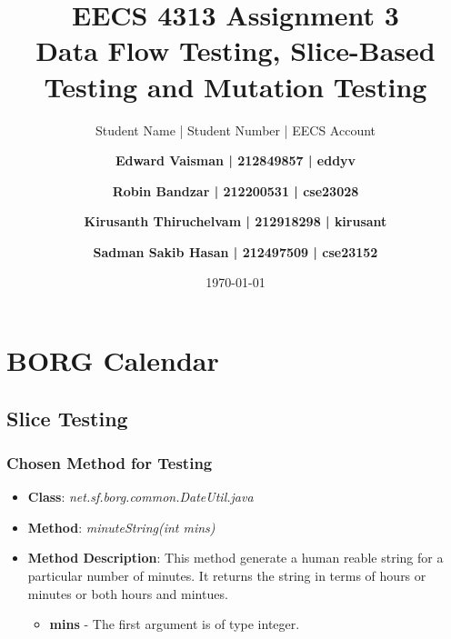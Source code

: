 \documentclass[fontsize=12pt,paper=letter,twoside]{scrartcl}
\author{Student Name | Student Number | EECS Account
\and \textbf{Edward Vaisman | 212849857 | eddyv}
\and \textbf{Robin Bandzar | 212200531 | cse23028}
\and \textbf{Kirusanth Thiruchelvam | 212918298 | kirusant}
\and \textbf{Sadman Sakib Hasan | 212497509 | cse23152}
}
\date{\today} %
\begin{document}
\title{EECS 4313 Assignment 3 \\Data Flow Testing, Slice-Based Testing and Mutation Testing}
\maketitle

\newpage

\tableofcontents


\newpage


\section{BORG Calendar}
\subsection{Slice Testing}

\subsubsection{Chosen Method for Testing}

\begin{itemize}
\item \textbf{Class}: \emph{net.sf.borg.common.DateUtil.java}
\item \textbf{Method}: \emph{minuteString(int mins)}
\item \textbf{Method Description}:
This method generate a human reable string for a particular number of minutes. It returns the string in terms of hours or minutes or both hours and mintues.
\begin{itemize}
\item \textbf{mins} - The first argument is of type integer.
\end{itemize}
\end{itemize}
\end{document}
